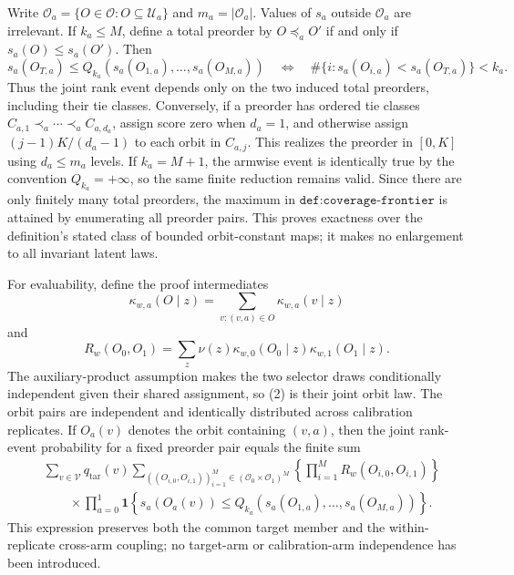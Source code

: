 Write \(\mathcal O_a=\{O\in\mathcal O:O\subseteq\mathcal U_a\}\) and \(m_a=|\mathcal O_a|\). Values of \(s_a\) outside \(\mathcal O_a\) are irrelevant. If \(k_a\le M\), define a total preorder by \(O\preceq_a O'\) if and only if \(s_a(O)\le s_a(O')\). Then
\[
s_a(O_{T,a})\le Q_{k_a}(s_a(O_{1,a}),\ldots,s_a(O_{M,a}))
\quad\Longleftrightarrow\quad
\#\{i:s_a(O_{i,a})<s_a(O_{T,a})\}<k_a.
\tag{1}
\]
Thus the joint rank event depends only on the two induced total preorders, including their tie classes. Conversely, if a preorder has ordered tie classes \(C_{a,1}\prec_a\cdots\prec_a C_{a,d_a}\), assign score zero when \(d_a=1\), and otherwise assign \((j-1)K/(d_a-1)\) to each orbit in \(C_{a,j}\). This realizes the preorder in \([0,K]\) using \(d_a\le m_a\) levels. If \(k_a=M+1\), the armwise event is identically true by the convention \(Q_{k_a}=+\infty\), so the same finite reduction remains valid. Since there are only finitely many total preorders, the maximum in \(\texttt{def:coverage-frontier}\) is attained by enumerating all preorder pairs. This proves exactness over the definition's stated class of bounded orbit-constant maps; it makes no enlargement to all invariant latent laws.

For evaluability, define the proof intermediates
\[
\kappa_{w,a}(O\mid z)=\sum_{v:(v,a)\in O}\kappa_{w,a}(v\mid z)
\]
and
\[
R_w(O_0,O_1)=\sum_z\nu(z)\kappa_{w,0}(O_0\mid z)\kappa_{w,1}(O_1\mid z).
\tag{2}
\]
The auxiliary-product assumption makes the two selector draws conditionally independent given their shared assignment, so (2) is their joint orbit law. The orbit pairs are independent and identically distributed across calibration replicates. If \(O_a(v)\) denotes the orbit containing \((v,a)\), then the joint rank-event probability for a fixed preorder pair equals the finite sum
\[
\begin{aligned}
&\sum_{v\in\mathcal V}q_{\mathrm{tar}}(v)
\sum_{((O_{i,0},O_{i,1}))_{i=1}^M\in(\mathcal O_0\times\mathcal O_1)^M}
\left\{\prod_{i=1}^M R_w(O_{i,0},O_{i,1})\right\}\\
&\qquad\times\prod_{a=0}^1\mathbf 1\!\left\{s_a(O_a(v))\le Q_{k_a}(s_a(O_{1,a}),\ldots,s_a(O_{M,a}))\right\}.
\end{aligned}
\tag{3}
\]
This expression preserves both the common target member and the within-replicate cross-arm coupling; no target-arm or calibration-arm independence has been introduced.

